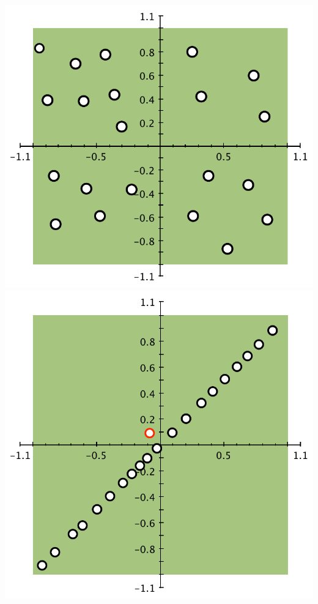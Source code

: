 \documentclass[landscape,footrule]{foils}
\begin{document}
\begin{center}
\includegraphics[scale=0.655]{good-layout}\hspace*{1cm}
\includegraphics[scale=0.6]{bad-layout}
\end{center}
\end{document}
